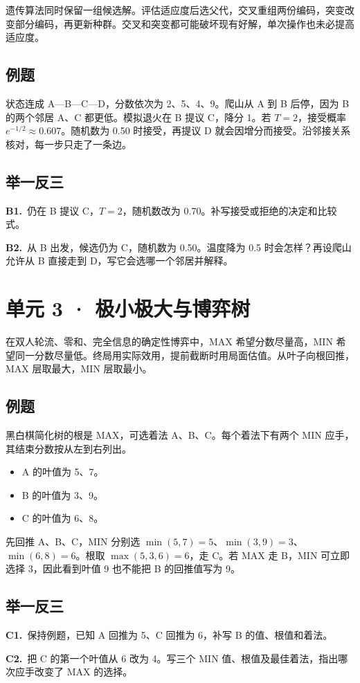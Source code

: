 \documentclass[UTF8,a4paper,11pt]{ctexart}
\newcommand{\CompactQuestion}[2]{\par\noindent\textbf{#1.}\ #2\par\vspace{.8em}}
\begin{document}
遗传算法同时保留一组候选解。评估适应度后选父代，交叉重组两份编码，突变改变部分编码，再更新种群。交叉和突变都可能破坏现有好解，单次操作也未必提高适应度。

\subsection{例题}
状态连成 A—B—C—D，分数依次为 2、5、4、9。爬山从 A 到 B 后停，因为 B 的两个邻居 A、C 都更低。模拟退火在 B 提议 C，降分 1。若 $T=2$，接受概率 $e^{-1/2}\approx0.607$。随机数为 0.50 时接受，再提议 D 就会因增分而接受。沿邻接关系核对，每一步只走了一条边。

\subsection{举一反三}
\CompactQuestion{B1}{仍在 B 提议 C，$T=2$，随机数改为 0.70。补写接受或拒绝的决定和比较式。}
\CompactQuestion{B2}{从 B 出发，候选仍为 C，随机数为 0.50。温度降为 0.5 时会怎样？再设爬山允许从 B 直接走到 D，写它会选哪一个邻居并解释。}
\clearpage
\section{单元 3 · 极小极大与博弈树}
在双人轮流、零和、完全信息的确定性博弈中，MAX 希望分数尽量高，MIN 希望同一分数尽量低。终局用实际效用，提前截断时用局面估值。从叶子向根回推，MAX 层取最大，MIN 层取最小。

\subsection{例题}
黑白棋简化树的根是 MAX，可选着法 A、B、C。每个着法下有两个 MIN 应手，其结束分数按从左到右列出。

\begin{itemize}
\item A 的叶值为 5、7。
\item B 的叶值为 3、9。
\item C 的叶值为 6、8。
\end{itemize}
先回推 A、B、C，MIN 分别选 $\min(5,7)=5$、$\min(3,9)=3$、$\min(6,8)=6$。根取 $\max(5,3,6)=6$，走 C。若 MAX 走 B，MIN 可立即选择 3，因此看到叶值 9 也不能把 B 的回推值写为 9。

\subsection{举一反三}
\CompactQuestion{C1}{保持例题，已知 A 回推为 5、C 回推为 6，补写 B 的值、根值和着法。}
\CompactQuestion{C2}{把 C 的第一个叶值从 6 改为 4。写三个 MIN 值、根值及最佳着法，指出哪次应手改变了 MAX 的选择。}
\clearpage
\end{document}
